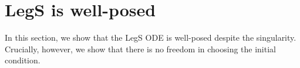\documentclass{article}
\newtheorem{theorem}{Theorem}
\theoremstyle{definition}
\newcommand{\js}[1]{{\color{purple}#1}}
\begin{document}
\section{LegS is well-posed} \label{sec:well-posed}
In this section, we show that the LegS ODE is well-posed despite the singularity. Crucially, however, we show that there is no freedom in choosing the initial condition. 




\end{document}
